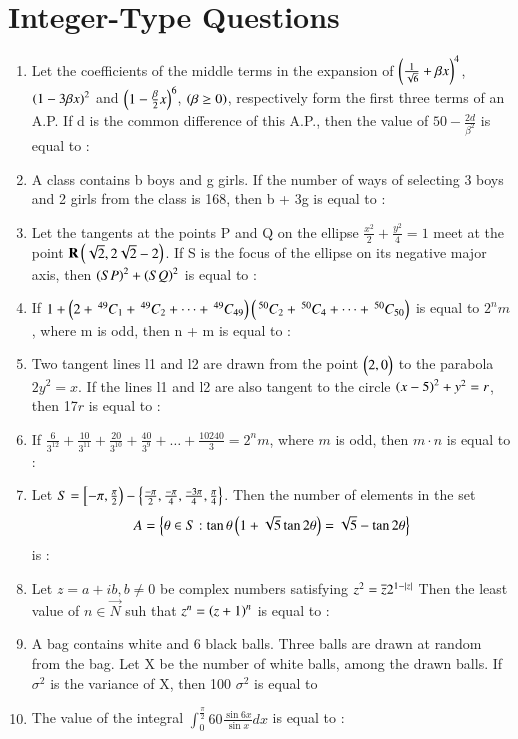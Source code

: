\documentclass[journal,12pt,onecolumn]{IEEEtran}
\newcommand{\nCr}[2]{\,^{#1}C_{#2}}
\theoremstyle{remark}
\begin{document}
\section{Integer-Type Questions}
\begin{enumerate}
	\item Let the coefficients of the middle terms in the expansion of $\left(\frac{1}{\sqrt{6}} + \beta x \right)^4$, $\left(1 - 3 \beta x\right)^2$ and $\left(1 - \frac{\beta}{2} x\right)^6$, $\left(\beta \geq 0\right)$, respectively form the first three terms of an A.P. If d is the common difference of this A.P., then the value of $50 - \frac{2d}{\beta^{2}}$ is equal to :
	\item A class contains b boys and g girls. If the number of ways of selecting 3 boys and 2 girls from the class is 168, then b + 3g is equal to :
	\item Let the tangents at the points P and Q on the ellipse $\frac{x^2}{2} + \frac{y^2}{4} = 1$ meet at the point $\mathbf{R}\begin{pmatrix}\sqrt{2}, 2\sqrt{2}-2\end{pmatrix}$. If S is the focus of the ellipse on its negative major axis, then $\left(SP\right)^2 + \left(SQ\right)^2$ is equal to :
	\item  If $ 1 + \brak{2 + \nCr{49}{1} + \nCr{49}{2} + \dots + \nCr{49}{49}}\brak{\nCr{50}{2} + \nCr{50}{4} + \dots + \nCr{50}{50}}$ is equal to $2^{n}m$, where m is odd, then n + m is equal to :
	\item Two tangent lines l1 and l2 are drawn from the point $\begin{pmatrix}2,0\end{pmatrix}$ to the parabola $2y^2 = x$. If the lines l1 and l2 are also tangent to the circle $\left(x-5\right)^2 + y^2 = r$, then 17$r$ is equal to :
	\item If $\frac{6}{3^{12}} + \frac{10}{3^{11}} + \frac{20}{3^{10}} + \frac{40}{3^{9}} + \dots + \frac{10240}{3} = 2^{n}{m}$, where $m$ is odd, then $m\cdot n$ is equal to :
	\item Let $S = \left[{-\pi, \frac{\pi}{2}}\right) - \left\{\frac{-\pi}{2}, \frac{-\pi}{4}, \frac{-3\pi}{4}, \frac{\pi}{4}\right\}$. Then the number of elements in the set $$ A = \left\{\theta \in S : \tan{\theta}\left(1 + \sqrt{5}\tan{2\theta}\right) = \sqrt{5} - \tan{2\theta}\right\}$$ is :
	\item Let $ z = a + ib, b \neq 0$ be complex numbers satisfying $z^2 = \overline{z} 2^{1 - \left\vert z\right\vert}$ Then the least value of $n \in \vec{N}$ suh that $z^{n} = \left(z+1\right)^{n}$ is equal to :
	\item A bag contains  white and 6 black balls. Three balls are drawn at random from the bag. Let X be the number of white balls, among the drawn balls. If $\sigma^2$ is the variance of X, then 100 $\sigma^2$ is equal to
	\item The value of the integral $\int_{0}^{\frac{\pi}{2}} 60 \frac{\sin{6x}}{\sin{x}} dx $ is equal to :

\end{enumerate}
\end{document}
